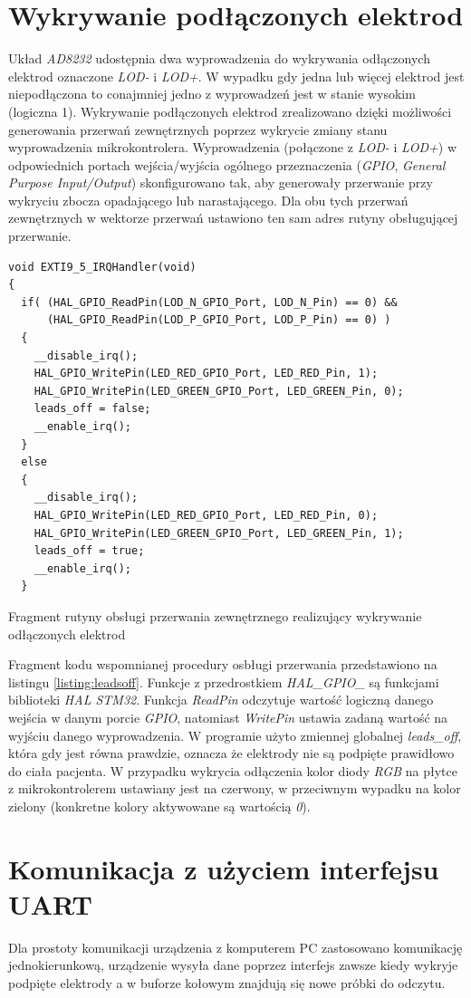 \newpage

\section{Wykrywanie podłączonych elektrod}

Układ \textit{AD8232} udostępnia dwa wyprowadzenia do wykrywania odłączonych elektrod oznaczone \textit{LOD-} i \textit{LOD+}.
W wypadku gdy jedna lub więcej elektrod jest niepodłączona to conajmniej jedno z wyprowadzeń jest w stanie wysokim 
(logiczna 1).
Wykrywanie podłączonych elektrod zrealizowano dzięki możliwości generowania przerwań zewnętrznych poprzez wykrycie zmiany
stanu wyprowadzenia mikrokontrolera. Wyprowadzenia (połączone z \textit{LOD-} i \textit{LOD+}) w odpowiednich portach 
wejścia/wyjścia ogólnego przeznaczenia (\textit{GPIO}, \textit{General Purpose Input/Output})
skonfigurowano tak, aby generowały przerwanie przy wykryciu zbocza opadającego lub narastającego. 
Dla obu tych przerwań zewnętrznych w wektorze przerwań ustawiono ten sam adres rutyny obsługującej przerwanie.

\begin{listing}
\begin{verbatim}
void EXTI9_5_IRQHandler(void)
{
  if( (HAL_GPIO_ReadPin(LOD_N_GPIO_Port, LOD_N_Pin) == 0) &&
      (HAL_GPIO_ReadPin(LOD_P_GPIO_Port, LOD_P_Pin) == 0) )
  {
    __disable_irq();
    HAL_GPIO_WritePin(LED_RED_GPIO_Port, LED_RED_Pin, 1);
    HAL_GPIO_WritePin(LED_GREEN_GPIO_Port, LED_GREEN_Pin, 0);
    leads_off = false;
    __enable_irq();
  }
  else
  {
    __disable_irq();
    HAL_GPIO_WritePin(LED_RED_GPIO_Port, LED_RED_Pin, 0);
    HAL_GPIO_WritePin(LED_GREEN_GPIO_Port, LED_GREEN_Pin, 1);
    leads_off = true;
    __enable_irq();
  }
\end{verbatim} 
\caption{Fragment rutyny obsługi przerwania zewnętrznego 
          realizujący wykrywanie odłączonych elektrod}
\label{listing:leadsoff}
\end{listing}

Fragment kodu wspomnianej procedury osbługi przerwania przedstawiono na listingu \ref{listing:leadsoff}.
Funkcje z przedrostkiem \textit{HAL\_GPIO\_} są funkcjami biblioteki \textit{HAL STM32}. Funkcja
\textit{ReadPin} odczytuje wartość logiczną danego wejścia w danym porcie \textit{GPIO}, natomiast
\textit{WritePin} ustawia zadaną wartość na wyjściu danego wyprowadzenia. W programie użyto zmiennej globalnej
\textit{leads\_off}, która gdy jest równa prawdzie, oznacza że elektrody nie są podpięte prawidłowo do ciała pacjenta.
W przypadku wykrycia odłączenia kolor diody \textit{RGB} na płytce z mikrokontrolerem ustawiany jest na czerwony, w
przeciwnym wypadku na kolor zielony (konkretne kolory aktywowane są wartością \textit{0}).

\section{Komunikacja z użyciem interfejsu UART}

Dla prostoty komunikacji urządzenia z komputerem PC zastosowano komunikację jednokierunkową,
urządzenie wysyła dane poprzez interfejs zawsze kiedy wykryje podpięte elektrody a w buforze kołowym znajdują 
się nowe próbki do odczytu.

